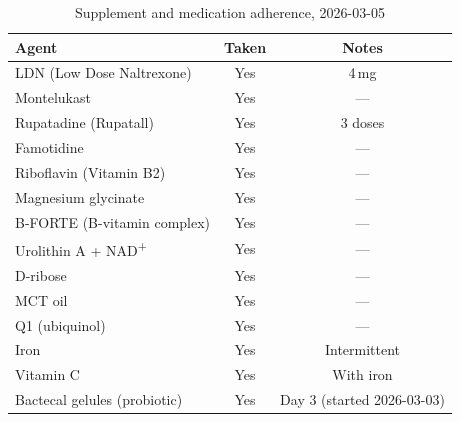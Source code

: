 \begin{table}[h]
\centering
\caption{Supplement and medication adherence, 2026-03-05}
\label{tab:adherence-2026-03-05}
\begin{tabular}{lcc}
\toprule
Agent & Taken & Notes \\
\midrule
LDN (Low Dose Naltrexone)                   & Yes & 4\,mg \\
Montelukast                                  & Yes & --- \\
Rupatadine (Rupatall)                        & Yes & 3 doses \\
Famotidine                                   & Yes & --- \\
Riboflavin (Vitamin B2)                      & Yes & --- \\
Magnesium glycinate                          & Yes & --- \\
B-FORTE (B-vitamin complex)                  & Yes & --- \\
Urolithin A + NAD\textsuperscript{+}         & Yes & --- \\
D-ribose                                     & Yes & --- \\
MCT oil                                      & Yes & --- \\
Q1 (ubiquinol)                               & Yes & --- \\
Iron                                         & Yes & Intermittent \\
Vitamin C                                    & Yes & With iron \\
Bactecal gelules (probiotic)                 & Yes & Day 3 (started 2026-03-03) \\
\bottomrule
\end{tabular}
\end{table}
